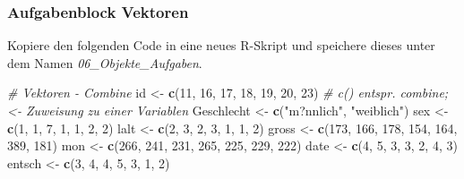 \documentclass[]{article}
\newenvironment{Shaded}{\begin{snugshade}}{\end{snugshade}}
\newcommand{\KeywordTok}[1]{\textcolor[rgb]{0.13,0.29,0.53}{\textbf{#1}}}
\newcommand{\DecValTok}[1]{\textcolor[rgb]{0.00,0.00,0.81}{#1}}
\newcommand{\StringTok}[1]{\textcolor[rgb]{0.31,0.60,0.02}{#1}}
\newcommand{\CommentTok}[1]{\textcolor[rgb]{0.56,0.35,0.01}{\textit{#1}}}
\newcommand{\NormalTok}[1]{#1}
\begin{document}
\subsubsection*{Aufgabenblock Vektoren}\label{aufgabenblock-vektoren}

Kopiere den folgenden Code in eine neues R-Skript und speichere dieses
unter dem Namen \emph{06\_Objekte\_Aufgaben}.

\begin{Shaded}
\begin{Highlighting}[]
    \CommentTok{# Vektoren - Combine}
\NormalTok{    id     <-}\StringTok{ }\KeywordTok{c}\NormalTok{(}\DecValTok{11}\NormalTok{, }\DecValTok{16}\NormalTok{, }\DecValTok{17}\NormalTok{, }\DecValTok{18}\NormalTok{, }\DecValTok{19}\NormalTok{, }\DecValTok{20}\NormalTok{, }\DecValTok{23}\NormalTok{) }\CommentTok{# c() entspr. combine; <- Zuweisung zu einer Variablen}
\NormalTok{    Geschlecht <-}\StringTok{ }\KeywordTok{c}\NormalTok{(}\StringTok{"m?nnlich"}\NormalTok{, }\StringTok{"weiblich"}\NormalTok{)}
\NormalTok{    sex    <-}\StringTok{ }\KeywordTok{c}\NormalTok{(}\DecValTok{1}\NormalTok{, }\DecValTok{1}\NormalTok{, }\DecValTok{7}\NormalTok{, }\DecValTok{1}\NormalTok{, }\DecValTok{1}\NormalTok{, }\DecValTok{2}\NormalTok{, }\DecValTok{2}\NormalTok{)}
\NormalTok{    lalt   <-}\StringTok{ }\KeywordTok{c}\NormalTok{(}\DecValTok{2}\NormalTok{, }\DecValTok{3}\NormalTok{, }\DecValTok{2}\NormalTok{, }\DecValTok{3}\NormalTok{, }\DecValTok{1}\NormalTok{, }\DecValTok{1}\NormalTok{, }\DecValTok{2}\NormalTok{)}
\NormalTok{    gross  <-}\StringTok{  }\KeywordTok{c}\NormalTok{(}\DecValTok{173}\NormalTok{, }\DecValTok{166}\NormalTok{, }\DecValTok{178}\NormalTok{, }\DecValTok{154}\NormalTok{, }\DecValTok{164}\NormalTok{, }\DecValTok{389}\NormalTok{, }\DecValTok{181}\NormalTok{)}
\NormalTok{    mon    <-}\StringTok{ }\KeywordTok{c}\NormalTok{(}\DecValTok{266}\NormalTok{, }\DecValTok{241}\NormalTok{, }\DecValTok{231}\NormalTok{, }\DecValTok{265}\NormalTok{, }\DecValTok{225}\NormalTok{, }\DecValTok{229}\NormalTok{, }\DecValTok{222}\NormalTok{)}
\NormalTok{    date   <-}\StringTok{ }\KeywordTok{c}\NormalTok{(}\DecValTok{4}\NormalTok{, }\DecValTok{5}\NormalTok{, }\DecValTok{3}\NormalTok{, }\DecValTok{3}\NormalTok{, }\DecValTok{2}\NormalTok{, }\DecValTok{4}\NormalTok{, }\DecValTok{3}\NormalTok{)}
\NormalTok{    entsch <-}\StringTok{ }\KeywordTok{c}\NormalTok{(}\DecValTok{3}\NormalTok{, }\DecValTok{4}\NormalTok{, }\DecValTok{4}\NormalTok{, }\DecValTok{5}\NormalTok{, }\DecValTok{3}\NormalTok{, }\DecValTok{1}\NormalTok{, }\DecValTok{2}\NormalTok{)}

\end{Highlighting}
\end{Shaded}
\end{document}
